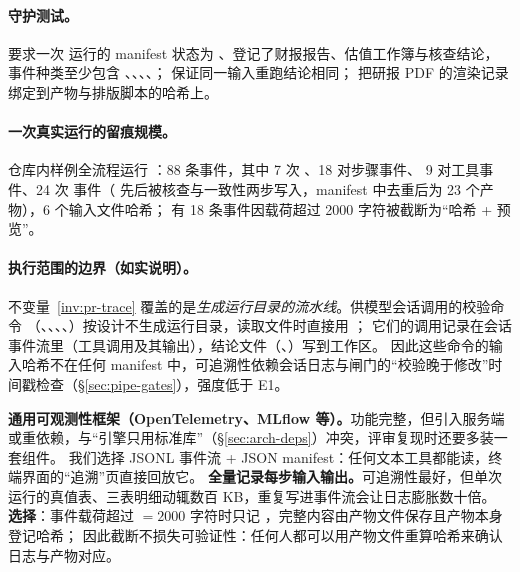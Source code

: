 \paragraph{守护测试。} 要求一次  运行的 manifest 状态为 、登记了财报报告、估值工作簿与核查结论，
事件种类至少包含 、、、、； 保证同一输入重跑结论相同；
 把研报 PDF 的渲染记录绑定到产物与排版脚本的哈希上。

\paragraph{一次真实运行的留痕规模。}仓库内样例全流程运行 ：88 条事件，其中 7 次 、18 对步骤事件、
9 对工具事件、24 次  事件（ 先后被核查与一致性两步写入，manifest 中去重后为 23 个产物），6 个输入文件哈希；
有 18 条事件因载荷超过 2000 字符被截断为“哈希 + 预览”。

\paragraph{执行范围的边界（如实说明）。}不变量~\ref{inv:pr-trace} 覆盖的是\emph{生成运行目录的流水线}。供模型会话调用的校验命令
（、、、、）按设计不生成运行目录，读取文件时直接用 ；
它们的调用记录在会话事件流里（工具调用及其输出），结论文件（、）写到工作区。
因此这些命令的输入哈希不在任何 manifest 中，可追溯性依赖会话日志与闸门的“校验晚于修改”时间戳检查（\S\ref{sec:pipe-gates}），强度低于 E1。

\begin{tradeoff}[：日志框架与截断策略]
\textbf{通用可观测性框架（OpenTelemetry、MLflow 等）。}功能完整，但引入服务端或重依赖，与“引擎只用标准库”（\S\ref{sec:arch-deps}）冲突，评审复现时还要多装一套组件。
我们选择 JSONL 事件流 + JSON manifest：任何文本工具都能读，终端界面的“追溯”页直接回放它。
\textbf{全量记录每步输入输出。}可追溯性最好，但单次运行的真值表、三表明细动辄数百 KB，重复写进事件流会让日志膨胀数十倍。
\textbf{选择}：事件载荷超过 ${}=2000$ 字符时只记 ，完整内容由产物文件保存且产物本身登记哈希；
因此截断不损失可验证性：任何人都可以用产物文件重算哈希来确认日志与产物对应。
\end{tradeoff}

